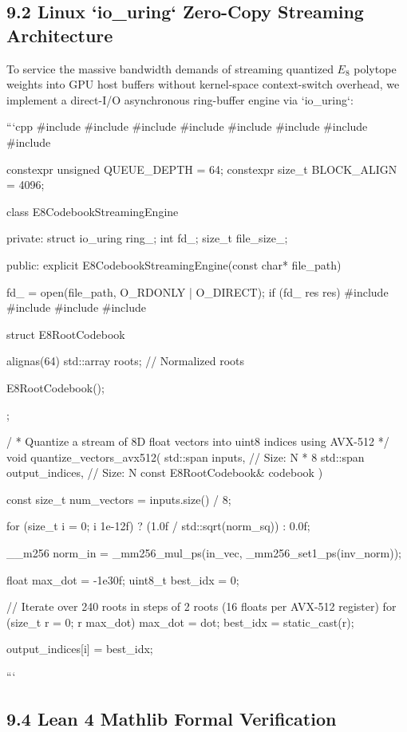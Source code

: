 \documentclass[11pt,twoside,openright]{amsbook}
\begin{document}
\subsection{9.2 Linux `io_uring` Zero-Copy Streaming Architecture}

To service the massive bandwidth demands of streaming quantized $E_8$ polytope weights into GPU host buffers without kernel-space context-switch overhead, we implement a direct-I/O asynchronous ring-buffer engine via `io_uring`:

```cpp
#include 
#include 
#include 
#include 
#include 
#include 
#include 
#include 

constexpr unsigned QUEUE_DEPTH = 64;
constexpr size_t BLOCK_ALIGN = 4096;

class E8CodebookStreamingEngine {
private:
    struct io_uring ring_;
    int fd_;
    size_t file_size_;

public:
    explicit E8CodebookStreamingEngine(const char* file_path) {
        fd_ = open(file_path, O_RDONLY | O_DIRECT);
        if (fd_ res res) 
#include 
#include 
#include 
#include 

struct E8RootCodebook {
    alignas(64) std::array roots; // Normalized roots

    E8RootCodebook();
};

/\textit{}
 * Quantize a stream of 8D float vectors into uint8 indices using AVX-512
 */
void quantize_vectors_avx512(
    std::span inputs,       // Size: N * 8
    std::span output_indices,   // Size: N
    const E8RootCodebook& codebook
) {
    const size_t num_vectors = inputs.size() / 8;

    for (size_t i = 0; i  1e-12f) ? (1.0f / std::sqrt(norm_sq)) : 0.0f;

        __m256 norm_in = _mm256_mul_ps(in_vec, _mm256_set1_ps(inv_norm));

        float max_dot = -1e30f;
        uint8_t best_idx = 0;

        // Iterate over 240 roots in steps of 2 roots (16 floats per AVX-512 register)
        for (size_t r = 0; r  max_dot) {
                max_dot = dot;
                best_idx = static_cast(r);
            }
        }

        output_indices[i] = best_idx;
    }
}
```

\subsection{9.4 Lean 4 Mathlib Formal Verification}
\end{document}

